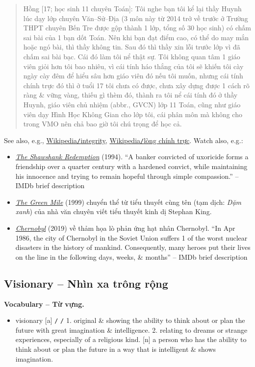 \documentclass[12pt,twoside]{book}
\begin{document}
\begin{quote}
	{\sf Hồng [17; học sinh 11 chuyên Toán]}: Tôi nghe bạn tôi kể lại thầy Huynh lúc dạy lớp chuyên Văn--Sử--Địa (3 môn này từ 2014 trở về trước ở Trường THPT chuyên Bến Tre được gộp thành 1 lớp, tổng số 30 học sinh) có chấm sai bài của 1 bạn dốt Toán. Nên khi bạn đạt điểm cao, có thể do may mắn hoặc ngó bài, thì thầy không tin. Sau đó thì thầy xin lỗi trước lớp vì đã chấm sai bài bạc. Cái đó làm tôi nể thật sự. Tôi không quan tâm 1 giáo viên giỏi hơn tôi bao nhiêu, vì cái tính háo thắng của tôi sẽ khiến tôi cày ngày cày đêm để hiểu sâu hơn giáo viên đó nếu tôi muốn, nhưng cái tính chính trực đó thì ở tuổi 17 tôi chưa có được, chưa xây dựng được 1 cách rõ ràng \& vững vàng, thiếu gì thèm đó, thành ra tôi nể cái tính đó ở thầy Huynh, giáo viên chủ nhiệm (abbr., GVCN) lớp 11 Toán, cũng như giáo viên dạy Hình Học Không Gian cho lớp tôi, cái phân môn mà không cho trong VMO nên chả bao giờ tôi chú trọng để học cả.
\end{quote}
See also, e.g., \href{https://en.wikipedia.org/wiki/Integrity}{Wikipedia{\tt/}integrity}, \href{https://vi.wikipedia.org/wiki/L%C3%B2ng_ch%C3%ADnh_tr%E1%BB%B1c}{Wikipedia{\tt/}lòng chính trực}. Watch also, e.g.:
\begin{itemize}
	\item \href{https://www.imdb.com/title/tt0111161}{\it The Shawshank Redemption} (1994). ``A banker convicted of uxoricide forms a friendship over a quarter century with a hardened convict, while maintaining his innocence and trying to remain hopeful through simple compassion.'' -- {\sf IMDb brief description}
	\item \href{https://www.imdb.com/title/tt0120689}{\it The Green Mile} (1999) chuyển thể từ tiểu thuyết cùng tên (tạm dịch: {\it Dặm xanh}) của nhà văn chuyên viết tiểu thuyết kinh dị {\sc Stephan King}.
	\item \href{https://www.imdb.com/title/tt7366338/}{\it Chernobyl} (2019) về thảm họa lò phản ứng hạt nhân Chernobyl. ``In Apr 1986, the city of Chernobyl in the Soviet Union suffers 1 of the worst nuclear disasters in the history of mankind. Consequently, many heroes put their lives on the line in the following days, weeks, \& months'' -- {\sf IMDb brief description}
\end{itemize}

\subsection{Visionary -- Nhìn xa trông rộng}
\textbf{\textsf{\small Vocabulary -- Từ vựng.}}
\begin{itemize}\small
	\item {\sf visionary} [a] {\tt/} {\tt/} 1. original \& showing the ability to think about or plan the future with great imagination \& intelligence. 2. relating to dreams or strange experiences, especially of a religious kind. [n] a person who has the ability to think about or plan the future in a way that is intelligent \& shows imagination.
\end{itemize}
\end{document}
